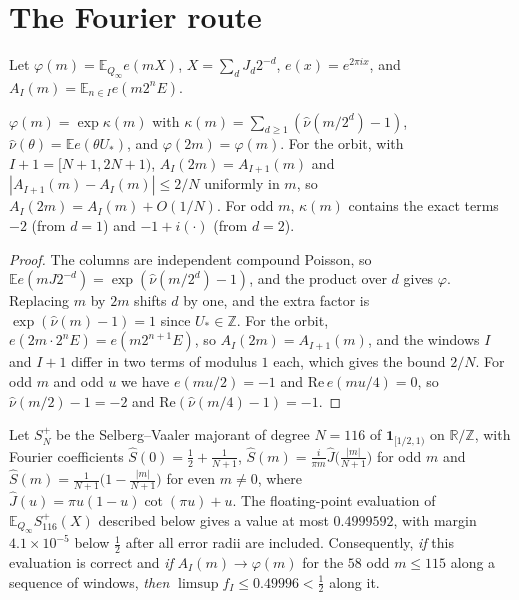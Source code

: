 \documentclass[11pt]{article}
\newcommand{\Ex}{\mathbb E}
\newcommand{\Av}{\mathbb E}
\newcommand{\ind}{\mathbf 1}
\newcommand{\Qinf}{{Q_\infty}}
\begin{document}
\section{The Fourier route}\label{sec:fourier}

Let $\varphi(m)=\Ex_\Qinf e(mX)$, $X=\sum_dJ_d2^{-d}$, $e(x)=e^{2\pi ix}$, and $A_I(m)=\Av_{n\in I}e(m2^nE)$.

\begin{proposition}\label{prop:phi}
$\varphi(m)=\exp\kappa(m)$ with $\kappa(m)=\sum_{d\ge1}(\hat\nu(m/2^d)-1)$, $\hat\nu(\theta)=\Ex e(\theta U_*)$, and $\varphi(2m)=\varphi(m)$. For the orbit, with $I+1=[N+1,2N+1)$, $A_I(2m)=A_{I+1}(m)$ and $|A_{I+1}(m)-A_I(m)|\le2/N$ uniformly in $m$, so $A_I(2m)=A_I(m)+O(1/N)$. For odd $m$, $\kappa(m)$ contains the exact terms $-2$ (from $d=1$) and $-1+i(\cdot)$ (from $d=2$).
\end{proposition}
\begin{proof}
The columns are independent compound Poisson, so $\Ex e(mJ2^{-d})=\exp(\hat\nu(m/2^d)-1)$, and the product over $d$ gives $\varphi$. Replacing $m$ by $2m$ shifts $d$ by one, and the extra factor is $\exp(\hat\nu(m)-1)=1$ since $U_*\in\mathbb Z$. For the orbit, $e(2m\cdot2^nE)=e(m2^{n+1}E)$, so $A_I(2m)=A_{I+1}(m)$, and the windows $I$ and $I+1$ differ in two terms of modulus $1$ each, which gives the bound $2/N$. For odd $m$ and odd $u$ we have $e(mu/2)=-1$ and $\mathrm{Re}\,e(mu/4)=0$, so $\hat\nu(m/2)-1=-2$ and $\mathrm{Re}(\hat\nu(m/4)-1)=-1$.
\end{proof}

\begin{proposition}\label{thm:fourier}
Let $S^+_{N}$ be the Selberg--Vaaler majorant of degree $N=116$ of $\ind_{[1/2,1)}$ on $\mathbb R/\mathbb Z$, with Fourier coefficients $\hat S(0)=\tfrac12+\tfrac1{N+1}$, $\hat S(m)=\frac{i}{\pi m}\hat J\bigl(\tfrac{|m|}{N+1}\bigr)$ for odd $m$ and $\hat S(m)=\frac1{N+1}\bigl(1-\tfrac{|m|}{N+1}\bigr)$ for even $m\ne0$, where $\hat J(u)=\pi u(1-u)\cot(\pi u)+u$. The floating-point evaluation of $\Ex_\Qinf S^+_{116}(X)$ described below gives a value at most $0.4999592$, with margin $4.1\times10^{-5}$ below $\tfrac12$ after all error radii are included. Consequently, \emph{if} this evaluation is correct and \emph{if} $A_I(m)\to\varphi(m)$ for the $58$ odd $m\le115$ along a sequence of windows, \emph{then} $\limsup f_I\le0.49996<\tfrac12$ along it.
\end{proposition}
\end{document}
